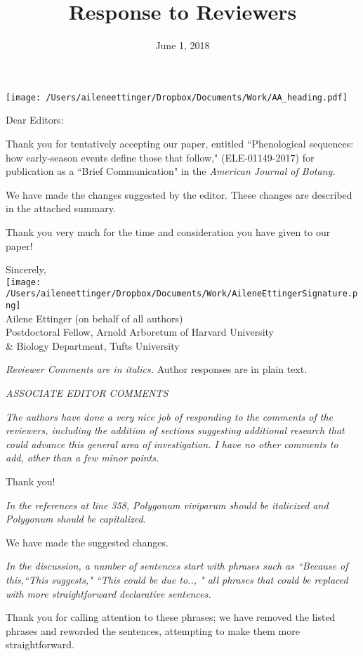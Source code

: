 \documentclass[10.95pt,a4paper]{letter}
\date{June 1, 2018}
\begin{document}
%

\begin{letter}{}
\texttt{[image: /Users/aileneettinger/Dropbox/Documents/Work/AA\_heading.pdf]}

\opening{Dear Editors:}
Thank you for tentatively accepting our paper, entitled ``Phenological sequences: how early-season events define those that follow,"  (ELE-01149-2017) for publication as a ``Brief Communication" in the \emph{American Journal of Botany.} 

We have made the changes suggested by the editor. These changes are described in the attached summary.

Thank you very much for the time and consideration you have given to our paper!

Sincerely,\\

\texttt{[image: /Users/aileneettinger/Dropbox/Documents/Work/AileneEttingerSignature.png]} \\
Ailene Ettinger (on behalf of all authors)\\
Postdoctoral Fellow, Arnold Arboretum of Harvard University \\ \& Biology Department, Tufts University

\end{letter}
\clearpage

\title{Response to Reviewers}
 \emph{Reviewer Comments are in italics.} Author responses are in plain text.

\par \emph{ASSOCIATE EDITOR COMMENTS}
\par \emph{The authors have done a very nice job of responding to the comments of the reviewers, including the addition of sections  suggesting additional research that could advance this general area of investigation.  I have no other comments to add, other than a few minor points.}
\par Thank you!
\par \emph  {In the references at line 358, Polygonum viviparum should be italicized and Polygonum should be capitalized.}
\par We have made the suggested changes.   

\par \emph{In the discussion, a number of sentences start with phrases such as ``Because of this,``This suggests," ``This could be due to.., "  all phrases that could be replaced with more straightforward declarative sentences.}
\par Thank you for calling attention to these phrases; we have removed the listed phrases and reworded the sentences, attempting to make them more straightforward. 
\end{document}
